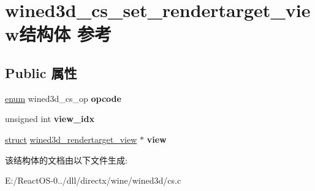 \hypertarget{structwined3d__cs__set__rendertarget__view}{}\section{wined3d\+\_\+cs\+\_\+set\+\_\+rendertarget\+\_\+view结构体 参考}
\label{structwined3d__cs__set__rendertarget__view}
\subsection*{Public 属性}
\begin{DoxyCompactItemize}
\item 
\mbox{\label{structwined3d__cs__set__rendertarget__view_a8220bcf8e33b78a12d9d6d850926a5e5}} 
\hyperlink{interfaceenum}{enum} wined3d\+\_\+cs\+\_\+op {\bfseries opcode}
\item 
\mbox{\label{structwined3d__cs__set__rendertarget__view_a8d6648863cc471bc9a60eba426347be9}} 
unsigned int {\bfseries view\+\_\+idx}
\item 
\mbox{\label{structwined3d__cs__set__rendertarget__view_ae385be5b87c0b9503fe247166b5ee8be}} 
\hyperlink{interfacestruct}{struct} \hyperlink{structwined3d__rendertarget__view}{wined3d\+\_\+rendertarget\+\_\+view} $\ast$ {\bfseries view}
\end{DoxyCompactItemize}


该结构体的文档由以下文件生成\+:\begin{DoxyCompactItemize}
\item 
E\+:/\+React\+O\+S-\/0../dll/directx/wine/wined3d/cs.\+c\end{DoxyCompactItemize}
